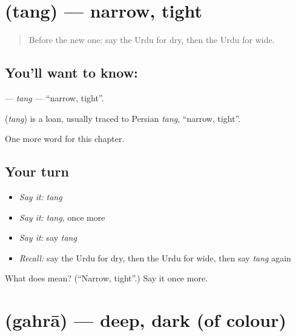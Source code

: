 \section[\texorpdfstring{\ur{تنگ} (tang)}{تنگ (tang)}]{ (tang) — narrow, tight}

\label{lesson:UR-C134-tang}



\begin{quote}
Before the new one: say the Urdu for dry, then the Urdu for wide.
\end{quote}

\subsection*{You'll want to know: }
\textbf{} — \emph{tang} — \textquotedblleft{}narrow, tight\textquotedblright{}.

\begin{cousinweb}
\textbf{} (\emph{tang}) is a loan, usually traced to Persian \emph{tang}, \textquotedblleft{}narrow, tight\textquotedblright{}.
\end{cousinweb}

\begin{grammarlens}[title={What you've built}]
One more word for this chapter.
\end{grammarlens}

\subsection*{Your turn}
\begin{itemize}
\raggedright
  \item \emph{Say it:} \emph{tang}
  \item \emph{Say it:} \emph{tang}, once more
  \item \emph{Say it:} say \emph{tang}
  \item \emph{Recall:} say the Urdu for dry, then the Urdu for wide, then say \emph{tang} again
\end{itemize}

\begin{tcolorbox}[breakable,colback=teal!4,colframe=teal!35!black,title={Before you move on}]
What does  mean? (\textquotedblleft{}Narrow, tight\textquotedblright{}.) Say it once more.
\end{tcolorbox}
\section[\texorpdfstring{\ur{گہرا} (gahrā)}{گہرا (gahrā)}]{ (gahrā) — deep, dark (of colour)}

